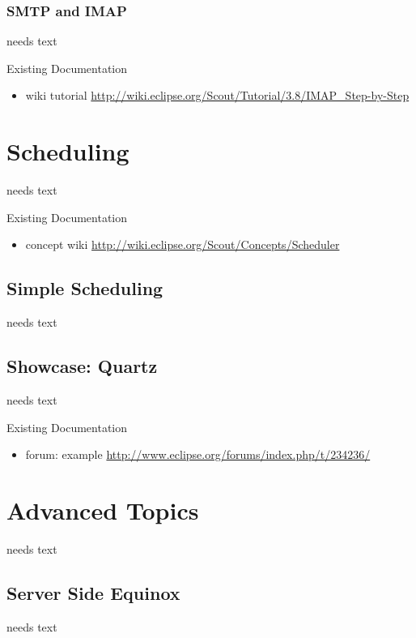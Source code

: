 \documentclass[a4paper,10pt,twoside]{book}
\begin{document}
\subsection{SMTP and IMAP}
needs text

\noindent Existing Documentation
\begin{itemize}
  \item wiki tutorial \url{http://wiki.eclipse.org/Scout/Tutorial/3.8/IMAP_Step-by-Step}
  \end{itemize}

\chapter{Scheduling}
needs text

\noindent Existing Documentation
\begin{itemize}
  \item concept wiki \url{http://wiki.eclipse.org/Scout/Concepts/Scheduler}
\end{itemize}

\section{Simple Scheduling}
needs text

\section{Showcase: Quartz}
needs text

\noindent Existing Documentation
\begin{itemize}
  \item forum: example \url{http://www.eclipse.org/forums/index.php/t/234236/}
\end{itemize}

\chapter{Advanced Topics}
needs text

\section{Server Side Equinox}
needs text
\end{document}
